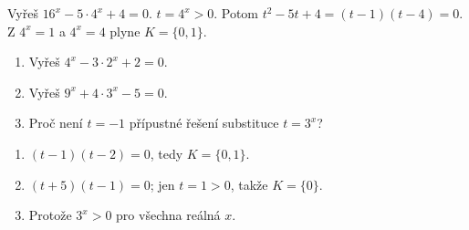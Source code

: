 \documentclass[11pt,a4paper]{article}
\begin{document}
\begin{zadaniReseniBox}[title={Rozšíření 1}]
Vyřeš $16^x-5\cdot4^x+4=0$.
\tcblower
$t=4^x>0$. Potom $t^2-5t+4=(t-1)(t-4)=0$. Z $4^x=1$ a $4^x=4$ plyne $K=\{0,1\}$.
\end{zadaniReseniBox}
\begin{zadaniReseniBox}[title={Domácí úkol}]
\begin{enumerate}[label=\alph*)]
\item Vyřeš $4^x-3\cdot2^x+2=0$.
\item Vyřeš $9^x+4\cdot3^x-5=0$.
\item Proč není $t=-1$ přípustné řešení substituce $t=3^x$?
\end{enumerate}
\tcblower
\begin{enumerate}[label=\alph*)]
\item $(t-1)(t-2)=0$, tedy $K=\{0,1\}$.
\item $(t+5)(t-1)=0$; jen $t=1>0$, takže $K=\{0\}$.
\item Protože $3^x>0$ pro všechna reálná $x$.
\end{enumerate}
\end{zadaniReseniBox}
\end{document}
